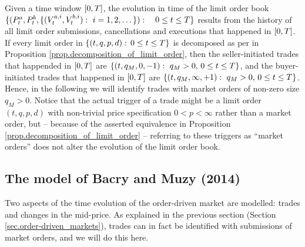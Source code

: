 \documentclass[10pt]{article}
\begin{document}
Given a time window $\timeWindow$, the evolution in time of the limit order book $\lbrace (\bestAskPrice_t, \bestBidPrice_t,\lbrace (\nthBestAskVolume[i]_t, \nthBestBidVolume[i]_t) : \, \, i=1,2,\dots\rbrace):  \quad 0\leq t \leq \timeHorizon \rbrace$ results from the history of all limit order submissions,  cancellations and executions that happened in $\timeWindow$. If every limit order in   $\lbrace (t,q,p,d): \, 0\leq t\leq \timeHorizon\rbrace$ is decomposed as per in Proposition \ref{prop.decomposition_of_limit_order}, then the seller-initiated trades that happended in $\timeWindow$ are $\lbrace (t,q_M,0,-1):\, \,  q_M>0, \, 0\leq t\leq \timeHorizon \rbrace$, and the buyer-initiated trades that happened in $\timeWindow$ are $\lbrace (t,q_M,\infty,+1):\, \,  q_M>0, \, 0\leq t\leq \timeHorizon \rbrace$.  Hence, in the following we will identify trades with market orders of non-zero size $q_M>0$. Notice that the actual trigger of a trade might be a limit order $(t,q,p,d)$ with non-trivial price specification $0<p<\infty$ rather than a market order, but -- because of the asserted equivalence in Proposition \ref{prop.decomposition_of_limit_order} -- referring to these triggers as ``market orders'' does not alter the evolution of the limit order book.  





\subsection{The model of Bacry and Muzy (2014)}\label{sec.BM14_model}
Two aspects of the time evolution of the order-driven market are modelled: trades and changes in the mid-price. As explained in the previous section (Section \ref{sec.order-driven_markets}), trades can in fact be identified with submissions of market orders, and we will do this here.
\end{document}
